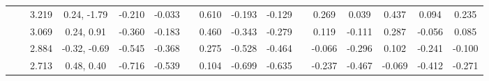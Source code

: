 \documentclass[prd,twocolumn,floatfix,nofootinbib]{revtex4}
\begin{document}
\begin{table*}[!htbp]
\begin{tabular}{cc|cc|cccccccccccc}
            &               &3.219  &0.24, -1.79 &-0.210 &-0.033 & &0.610 &-0.193 &-0.129 & &0.269 &0.039 &0.437 &0.094 &0.235 \\
            &               &3.069  &0.24, 0.91 &-0.360 &-0.183 & &0.460 &-0.343 &-0.279 & &0.119 &-0.111 &0.287 &-0.056 &0.085 \\
            &               &2.884  &-0.32, -0.69 &-0.545 &-0.368 & &0.275 &-0.528 &-0.464 & &-0.066 &-0.296 &0.102 &-0.241 &-0.100 \\
            &               &2.713  &0.48, 0.40 &-0.716 &-0.539 & &0.104 &-0.699 &-0.635 & &-0.237 &-0.467 &-0.069 &-0.412 &-0.271 \\
        \bottomrule[0.5pt]\bottomrule[1.5pt]
    \end{tabular}
\end{table*}
\end{document}
